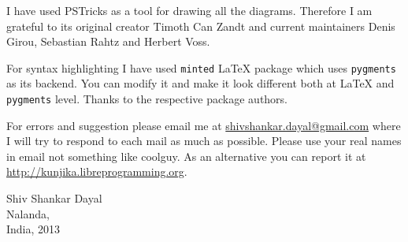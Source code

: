 I have used PSTricks as a tool for drawing all the diagrams. Therefore I am
grateful to its original creator Timoth Can Zandt and current maintainers Denis
Girou, Sebastian Rahtz and Herbert Voss.

For syntax highlighting I have used \texttt{minted} \LaTeX{} package which uses
\texttt{pygments} as its backend. You can modify it and make it look different
both at \LaTeX{} and \texttt{pygments} level. Thanks to the respective package
authors.

For errors and suggestion please email me at
\href{mailto:shivshankar.dayal@gmail.com}{shivshankar.dayal@gmail.com} where I
will try to respond to each mail as
much as possible. Please use your real names in email not something like
coolguy. As an alternative you can report it at \url{http://kunjika.libreprogramming.org}.
\begin{flushright}
Shiv Shankar Dayal\\
Nalanda,\\
India, 2013
\end{flushright}
